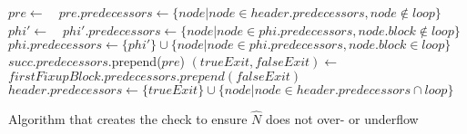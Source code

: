 \begin{algorithm}[H]
    \begin{algorithmic}
            \State $pre \gets\text{ }$ 
            \State $pre.predecessors \gets \{node \vert node \in header.predecessors, node \notin loop\}$
                \State $phi' \gets\text{ }$ 
                \State $phi'.predecessors \gets \{node \vert node \in phi.predecessors, node.block \notin loop\}$
                \State $phi.predecessors \gets \{phi'\} \cup \{node \vert node \in phi.predecessors, node.block \in loop\}$
                        \State $succ.predecessors$.prepend($pre$)
                    \EndIf
                \EndFor
            \EndFor
            \State $(trueExit, falseExit) \gets\text{ }$ 
            \State $firstFixupBlock.predecessors.prepend(falseExit)$
            \State $header.predecessors \gets \{trueExit\} \cup \{node \vert node \in header.predecessors \cap loop\}$
        \EndFunction
    \end{algorithmic}
    \caption{Algorithm that creates the check to ensure $\hat{N}$ does not over- or underflow}
    \label{alg:impl:fixup:header-cond:preheader}
\end{algorithm}